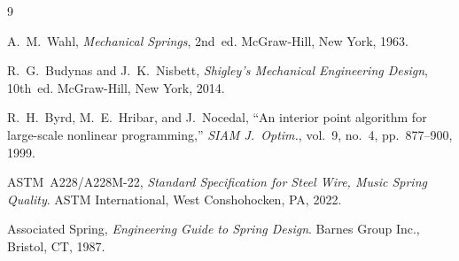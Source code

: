 \documentclass[10pt,twocolumn]{article}
\begin{document}
\begin{thebibliography}{9}

A.~M.~Wahl,
\textit{Mechanical Springs}, 2nd~ed.
McGraw-Hill, New York, 1963.

R.~G.~Budynas and J.~K.~Nisbett,
\textit{Shigley's Mechanical Engineering Design}, 10th~ed.
McGraw-Hill, New York, 2014.

R.~H.~Byrd, M.~E.~Hribar, and J.~Nocedal,
``An interior point algorithm for large-scale nonlinear programming,''
\textit{SIAM J.\ Optim.}, vol.~9, no.~4, pp.~877--900, 1999.

ASTM~A228/A228M-22,
\textit{Standard Specification for Steel Wire, Music Spring Quality}.
ASTM International, West Conshohocken, PA, 2022.

Associated Spring,
\textit{Engineering Guide to Spring Design}.
Barnes Group Inc., Bristol, CT, 1987.

\end{thebibliography}
\end{document}
